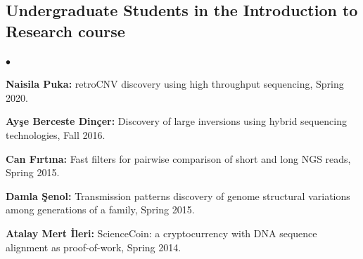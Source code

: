 \documentclass[margin,line]{res}
\newenvironment{list2}{
  \begin{list}{$\bullet$}{%
      \setlength{\itemsep}{0.1cm}
      \setlength{\parsep}{0in} \setlength{\parskip}{0in}
      \setlength{\topsep}{0in} \setlength{\partopsep}{0in} 
      \setlength{\leftmargin}{0.2in}}}{\end{list}}
\begin{document}
\begin{resume}
\vspace*{-.4cm}
  \subsection{\small \sc Undergraduate Students in the Introduction to Research course}
  \begin{list2}
  \item
    {\bf Naisila Puka:} retroCNV discovery using high throughput sequencing, Spring 2020.
  \item
    {\bf Ayşe Berceste Dinçer:} Discovery of large inversions using hybrid sequencing technologies, Fall 2016.
  \item
    {\bf Can Fırtına:} Fast filters for pairwise comparison of short and long NGS reads, Spring 2015.
  \item
    {\bf Damla Şenol:} Transmission patterns discovery of genome structural variations among generations of a family, Spring 2015.
  \item
    {\bf Atalay Mert İleri:} ScienceCoin: a cryptocurrency with DNA sequence alignment as proof-of-work, Spring 2014.
  \end{list2}
\vspace*{-.4cm}

\end{resume}
\end{document}
